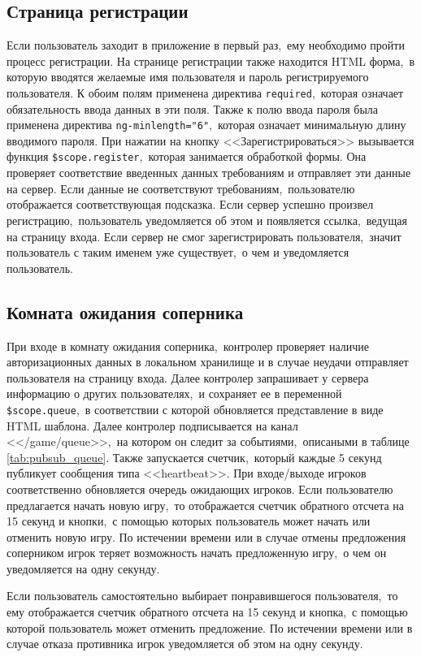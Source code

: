 \documentclass[14pt,a4paper]{report}
\begin{document}
\subsection{Страница регистрации}
Если пользователь заходит в приложение в первый раз,~ему необходимо пройти процесс регистрации. На странице регистрации также находится HTML форма,~в которую вводятся желаемые имя пользователя и пароль регистрируемого пользователя. К обоим полям применена директива \lstinline{required},~которая означает обязательность ввода данных в эти поля. Также к полю ввода пароля была применена директива \lstinline{ng-minlength="6"},~которая означает минимальную длину вводимого пароля. При нажатии на кнопку <<Зарегистрироваться>> вызывается функция \lstinline{$scope.register},~которая занимается обработкой формы. Она проверяет соответствие введенных данных требованиям и отправляет эти данные на сервер. Если данные не соответствуют требованиям,~пользователю отображается соответствующая подсказка. Если сервер успешно произвел регистрацию,~пользователь уведомляется об этом и появляется ссылка,~ведущая на страницу входа. Если сервер не смог зарегистрировать пользователя,~значит пользователь с таким именем уже существует,~о чем и уведомляется пользователь.

\subsection{Комната ожидания соперника}
При входе в комнату ожидания соперника,~контролер проверяет наличие авторизационных данных в локальном хранилище и в случае неудачи отправляет пользователя на страницу входа. Далее контролер запрашивает у сервера информацию о других пользователях,~и сохраняет ее в переменной \lstinline{$scope.queue},~в соответствии с которой обновляется представление в виде HTML шаблона. Далее контролер подписывается на канал <</game/queue>>,~на котором он следит за событиями,~описаными в таблице \ref{tab:pubsub_queue}. Также запускается счетчик,~который каждые 5 секунд публикует сообщения типа <<heartbeat>>. При входе/выходе игроков соответственно обновляется очередь ожидающих игроков. Если пользователю предлагается начать новую игру,~то отображается счетчик обратного отсчета на 15 секунд и кнопки,~с помощью которых пользователь может начать или отменить новую игру. По истечении времени или в случае отмены предложения соперником игрок теряет возможность начать предложенную игру,~о чем он уведомляется на одну секунду.

Если пользователь самостоятельно выбирает понравившегося пользователя,~то ему отображается счетчик обратного отсчета на 15 секунд и кнопка,~с помощью которой пользователь может отменить предложение. По истечении времени или в случае отказа противника игрок уведомляется об этом на одну секунду.
\end{document}
